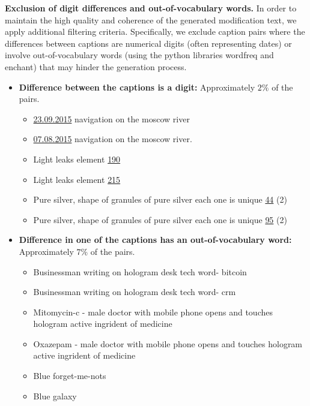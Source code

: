 \noindent\textbf{Exclusion of digit differences and out-of-vocabulary words.}
In order to maintain the high quality and coherence of the generated modification text, 
we apply additional filtering criteria. 
Specifically, we exclude caption pairs where the differences between captions 
are numerical digits (often representing dates) 
or involve out-of-vocabulary words (using the python libraries wordfreq and enchant) that may hinder the generation process.

\begin{itemize}
    \item \textbf{Difference between the captions is a digit:} Approximately $2\%$ of the pairs. 
    \begin{itemize}
        \item \underline{23.09.2015} navigation on the moscow river
        \item \underline{07.08.2015} navigation on the moscow river.	
    \end{itemize}
    \begin{itemize}
        \item Light leaks element \underline{190}
        \item Light leaks element \underline{215}
    \end{itemize}
    \begin{itemize}
        \item Pure silver, shape of granules of pure silver each one is unique \underline{44} (2)
        \item Pure silver, shape of granules of pure silver each one is unique \underline{95} (2)
    \end{itemize}
   \item \textbf{Difference in one of the captions has an out-of-vocabulary word:} Approximately $7\%$ of the pairs. 
    \begin{itemize}
        \item Businessman writing on hologram desk tech word- bitcoin
        \item Businessman writing on hologram desk tech word- crm
    \end{itemize}
    \begin{itemize}
        \item Mitomycin-c - male doctor with mobile phone opens and touches hologram active ingrident of medicine
        \item Oxazepam - male doctor with mobile phone opens and touches hologram active ingrident of medicine
    \end{itemize}
    \begin{itemize}
        \item Blue forget-me-nots
        \item Blue galaxy
    \end{itemize}
\end{itemize}


